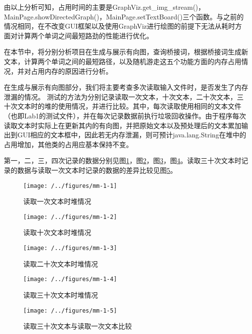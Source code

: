 由以上分析可知，占用时间的主要是GraphViz.get\_img\_stream()，MainPage.showDirectedGraph()，MainPage.setTextBoard()三个函数。与之前的情况相同，在不改变GUI框架以及使用GraphViz进行绘图的前提下无法从耗时方面对计算两个单词之间最短路劲的性能进行优化。

在本节中，将分别分析项目在生成与展示有向图，查询桥接词，根据桥接词生成新文本，计算两个单词之间的最短路径，以及随机游走这五个功能方面的内存占用情况，并对占用内存的原因进行分析。

在生成与展示有向图部分，我们将主要考查多次读取输入文件时，是否发生了内存泄漏的情况。
测试的方法为分别记录读取一次文本，十次文本，二十次文本，三十次文本时的堆的使用情况，并进行比较。其中，每次读取使用相同的文本文件（也即Lab1的测试文件），并在每次记录数据前执行垃圾回收操作。由于程序每次读取文本时实际上在更新其内的有向图，并把原始文本以及预处理后的文本累加输出到GUI相应的文本框中，因此若无内存泄漏，则可预计java.lang.String在堆中的占用增加，其他类的占用应基本保持不变。

第一，二，三，四次记录的数据分别见图\ref{fig:mm-1-1}，图\ref{fig:mm-1-2}，图\ref{fig:mm-1-3}，图\ref{fig:mm-1-4}。读取三十次文本时记录的数据与读取一次文本时记录的数据的差异比较见图\ref{fig:mm-1-5}。

\begin{figure}
\centering
\texttt{[image: /../figures/mm-1-1]}
\caption{读取一次文本时堆情况}
\label{fig:mm-1-1}
\end{figure}

\begin{figure}
\centering
\texttt{[image: /../figures/mm-1-2]}
\caption{读取十次文本时堆情况}
\label{fig:mm-1-2}
\end{figure}

\begin{figure}
\centering
\texttt{[image: /../figures/mm-1-3]}
\caption{读取二十次文本时堆情况}
\label{fig:mm-1-3}
\end{figure}

\begin{figure}
\centering
\texttt{[image: /../figures/mm-1-4]}
\caption{读取三十次文本时堆情况}
\label{fig:mm-1-4}
\end{figure}

\begin{figure}
\centering
\texttt{[image: /../figures/mm-1-5]}
\caption{读取三十次文本与读取一次文本比较}
\label{fig:mm-1-5}
\end{figure}

